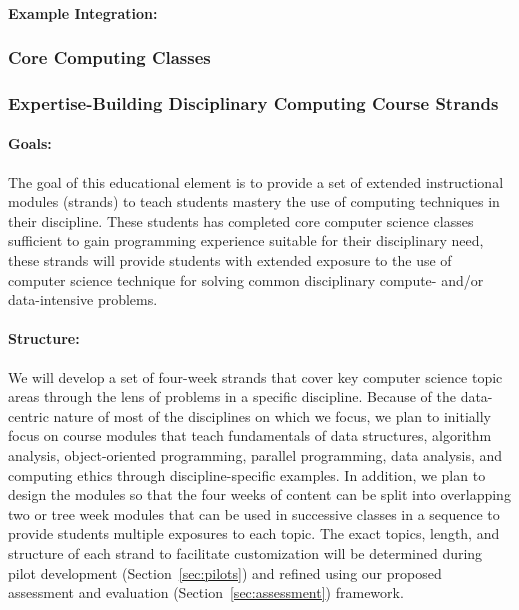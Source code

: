 \paragraph{Example Integration:}

\subsubsection{Core Computing Classes}

\subsubsection{Expertise-Building Disciplinary Computing Course Strands}
\paragraph{Goals:} The goal of this educational element is to provide a set of extended instructional modules (strands) to teach students mastery the use of computing techniques in their discipline. These students has completed core computer science classes sufficient to gain programming experience suitable for their disciplinary need, these strands will provide students with extended exposure to the use of computer science technique for solving common disciplinary compute- and/or data-intensive problems. 

\paragraph{Structure:} We will develop a set of four-week strands that cover key computer science topic areas through the lens of problems in a specific discipline. Because of the data-centric nature of most of the disciplines on which we focus, we plan to initially focus on course modules that teach fundamentals of data structures, algorithm analysis, object-oriented programming, parallel programming, data analysis, and computing ethics through discipline-specific examples. In addition, we plan to design the modules so that the four weeks of content can be split into overlapping two or tree week modules that can be used in successive classes in a sequence to provide students multiple exposures to each topic. The exact topics, length, and structure of each strand to facilitate customization will be determined during pilot development (Section~\ref{sec:pilots}) and refined using our proposed assessment and evaluation (Section~\ref{sec:assessment}) framework.


